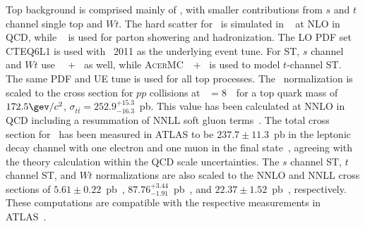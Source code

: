 Top background is comprised mainly of \ttbar, with smaller
contributions from $s$ and $t$ channel single top and $Wt$. The
hard scatter for \ttbar~is simulated in \POWHEG~\cite{bib:Frixione:2003ei} at NLO in QCD,
while ~\cite{bib:Sjostrand:2006za} is used for parton showering and
hadronization. The LO PDF set CTEQ6L1 is used with \PERUGIA~2011 as
the underlying event tune. For ST,
$s$ channel and $Wt$ use \POWHEGns~\cite{bib:Alioli:2009je,bib:Re:2010bp}~+~ as well, while
\textsc{AcerMC}~\cite{bib:Kersevan:2004yg}~+~ is used to model $t$-channel ST. The same
PDF and UE tune is used for all top processes. The
\ttbar~normalization is scaled to the cross section for $pp$
collisions at \sqrts~$=8$~\tev~for a top quark mass of
$172.5 \gev/c^2$, $\sigma_{t\bar{t}}=252.9^{+15.3}_{-16.3}$~pb. This
value has been calculated at NNLO in QCD including a resummation of
NNLL soft gluon
terms~\cite{bib:Cacciari:2011hy,bib:Beneke:2011mq,bib:Baernreuther:2012ws,bib:Czakon:2012zr,bib:Czakon:2012pz,bib:Czakon:2013goa,bib:Czakon:2011xx}.
The total cross section for \ttbar~has been measured in ATLAS to be
$237.7\pm11.3$~pb in the leptonic decay channel with one
electron and one muon in the final
state~\cite{bib:ttbar_cross_section}, agreeing with the
theory calculation within the QCD scale uncertainties. The $s$ channel
ST, $t$ channel ST, and $Wt$ normalizations are also scaled to the
NNLO and NNLL cross sections of
$5.61\pm0.22$~pb~\cite{bib:Kidonakis:2010tc},
$87.76^{+3.44}_{-1.91}$~pb~\cite{bib:Kidonakis:2011wy}, and
$22.37\pm1.52$~pb~\cite{bib:Kidonakis:2010ux}, respectively. These
computations are compatible with the respective measurements in
ATLAS~\cite{bib:tchan_cross_section,bib:Wt_cross_section}.

